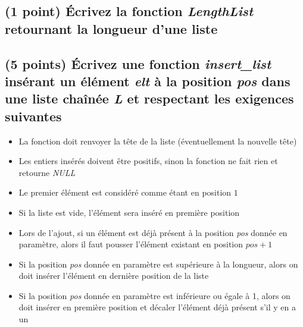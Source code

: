 \documentclass[11pt,a4paper]{article}
\begin{document}
\vspace*{-0.5cm}

\subsection{(1 point) \'Ecrivez la fonction \textit{LengthList} retournant la longueur d'une liste }




\clearpage


%
%


\subsection{(5 points) \'Ecrivez une fonction \textit{insert\_list} insérant un élément \textit{elt} à la position \textit{pos} dans une liste chaînée \textit{L} et respectant les exigences suivantes }

\begin{itemize}
\item La fonction doit renvoyer la tête de la liste (éventuellement la nouvelle tête)
\item Les entiers insérés doivent être positifs, sinon la fonction ne fait rien et retourne \textit{NULL}
\item Le premier élément est considéré comme étant en position $ 1 $
\item Si la liste est vide, l'élément sera inséré en première position
\item Lors de l'ajout, si un élément est déjà présent à la position \textit{pos} donnée en paramètre, alors il faut pousser l'élément existant en position $ pos + 1 $
\item Si la position \textit{pos} donnée en paramètre est supérieure à la longueur, alors on doit insérer l'élément en dernière position de la liste
\item Si la position \textit{pos} donnée en paramètre est inférieure ou égale à 1, alors on doit insérer en première position et décaler l'élément déjà présent s'il y en a un
\end{itemize}
\end{document}
